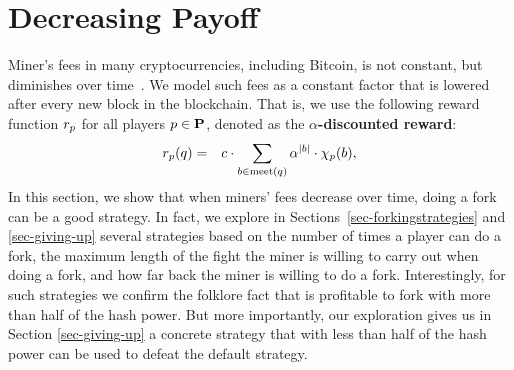 
\section{Decreasing Payoff}
\label{sec-dec}


Miner's fees in many cryptocurrencies, including Bitcoin, is not constant, but diminishes over time~\cite{Bitcoin,Monero,Litecoin,Bcash}. We model such 
fees as a constant factor that is lowered after every new block in the blockchain. That is, 
we use the following reward function $r_p$ for all players $p \in \mathbf{P}$, denoted as the \textbf{$\alpha$-discounted reward}: 
\begin{eqnarray*}
r_p(q) & = & 
c \cdot \sum_{b \in \text{\rm meet}(q)} \alpha^{|b|} \cdot \chi_p(b),
\end{eqnarray*}
In this section, we show that when miners' fees decrease over time, doing a fork can be a good strategy. In fact, we explore in Sections~\ref{sec-forkingstrategies} and \ref{sec-giving-up} several strategies based on the number of times a player can do a fork, the maximum length of the fight the miner is willing to carry out when doing a fork, and how far back the miner is willing to do a fork. Interestingly, for such strategies we confirm the folklore fact that is profitable to fork with more than half of the hash power. But more importantly, our exploration gives us in Section \ref{sec-giving-up} a concrete strategy that with less than half of the hash power 
can be used to defeat the default strategy.

